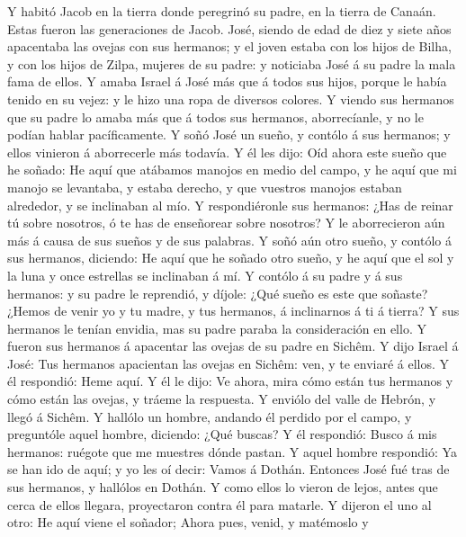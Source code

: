  Y habitó Jacob en la tierra donde peregrinó su padre, en
la tierra de Canaán.  Estas fueron las generaciones de
Jacob. José, siendo de edad de diez y siete años apacentaba las ovejas
con sus hermanos; y el joven estaba con los hijos de Bilha, y con los
hijos de Zilpa, mujeres de su padre: y noticiaba José á su padre la mala
fama de ellos.  Y amaba Israel á José más que á todos sus
hijos, porque le había tenido en su vejez: y le hizo una ropa de
diversos colores.  Y viendo sus hermanos que su padre lo
amaba más que á todos sus hermanos, aborrecíanle, y no le podían hablar
pacíficamente.  Y soñó José un sueño, y contólo á sus
hermanos; y ellos vinieron á aborrecerle más todavía.  Y
él les dijo: Oíd ahora este sueño que he soñado:  He aquí
que atábamos manojos en medio del campo, y he aquí que mi manojo se
levantaba, y estaba derecho, y que vuestros manojos estaban alrededor, y
se inclinaban al mío.  Y respondiéronle sus hermanos: ¿Has
de reinar tú sobre nosotros, ó te has de enseñorear sobre nosotros? Y le
aborrecieron aún más á causa de sus sueños y de sus palabras.
 Y soñó aún otro sueño, y contólo á sus hermanos,
diciendo: He aquí que he soñado otro sueño, y he aquí que el sol y la
luna y once estrellas se inclinaban á mí.  Y contólo á su
padre y á sus hermanos: y su padre le reprendió, y díjole: ¿Qué sueño es
este que soñaste? ¿Hemos de venir yo y tu madre, y tus hermanos, á
inclinarnos á ti á tierra?  Y sus hermanos le tenían
envidia, mas su padre paraba la consideración en ello.  Y
fueron sus hermanos á apacentar las ovejas de su padre en Sichêm.
 Y dijo Israel á José: Tus hermanos apacientan las ovejas
en Sichêm: ven, y te enviaré á ellos. Y él respondió: Heme aquí.
 Y él le dijo: Ve ahora, mira cómo están tus hermanos y
cómo están las ovejas, y tráeme la respuesta. Y enviólo del valle de
Hebrón, y llegó á Sichêm.  Y hallólo un hombre, andando
él perdido por el campo, y preguntóle aquel hombre, diciendo: ¿Qué
buscas?  Y él respondió: Busco á mis hermanos: ruégote
que me muestres dónde pastan.  Y aquel hombre respondió:
Ya se han ido de aquí; y yo les oí decir: Vamos á Dothán. Entonces José
fué tras de sus hermanos, y hallólos en Dothán.  Y como
ellos lo vieron de lejos, antes que cerca de ellos llegara, proyectaron
contra él para matarle.  Y dijeron el uno al otro: He
aquí viene el soñador;  Ahora pues, venid, y matémoslo y
